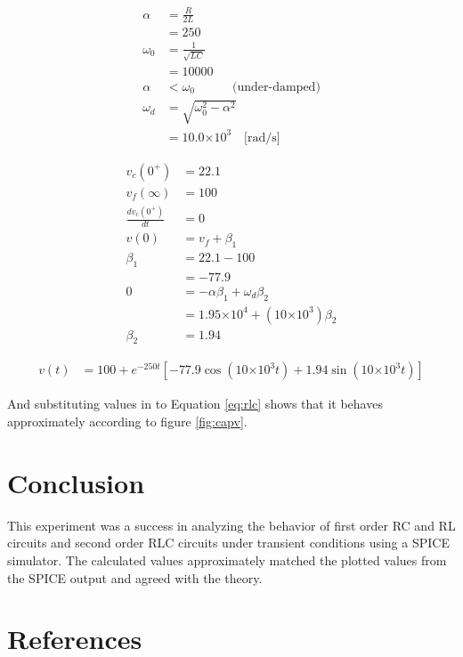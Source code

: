 \documentclass{article}
\providecommand{\e}[1]{\ensuremath{\times 10^{#1}}}
\begin{document}
\begin{align*}
	\alpha &= \frac{R}{2L} \\
			&= 250 \\
	\omega_0 &= \frac{1}{\sqrt{L C}} \\
			&= 10000 \\
	\alpha &< \omega_0 \quad\quad\quad \mbox{(under-damped)} \\
	\omega_d &= \sqrt{\omega_0^2 - \alpha^2} \\
		&= 10.0\e3 \quad \mbox{[rad/s]}
\end{align*}

\begin{align*}
	v_c(0^+) &= 22.1 \\
	v_f(\infty) &= 100 \\
	\frac{dv_c(0^+)}{dt} &= 0 \\
	v(0) &= v_f + \beta_1 \\
	\beta_1 &= 22.1 - 100 \\
			&= -77.9 \\
	0 &= - \alpha \beta_1 + \omega_d \beta_2 \\
	  &= 1.95\e4 + (10\e3) \beta_2 \\
	\beta_2 &= 1.94
\end{align*}

\begin{align}
	v(t) &= 100 + e^{-250 t} \left[ -77.9 \cos(10\e3 t) + 1.94 \sin(10\e3 t) \right] \label{eq:rlc}
\end{align}

And substituting values in to Equation \ref{eq:rlc} shows that it behaves
approximately according to figure \ref{fig:capv}.

\clearpage


\section{Conclusion}

This experiment was a success in analyzing the behavior of first order
RC and RL circuits and second order RLC circuits under transient conditions
using a SPICE simulator.
The calculated values approximately matched the plotted values from
the SPICE output and agreed with the theory.



\renewcommand*{\refname}{\vspace{-8mm}}
\section{References}


\end{document}
